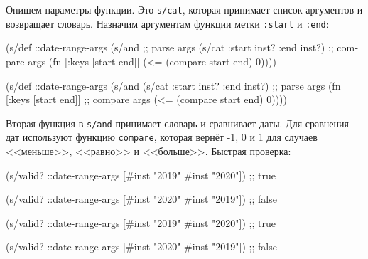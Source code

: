 Опишем параметры функции. Это \verb|s/cat|, которая принимает список аргументов
и возвращает словарь. Назначим аргументам функции метки \verb|:start| и
\verb|:end|:

\ifx\DEVICETYPE\MOBILE

\begin{english}
  \begin{clojure}
(s/def ::date-range-args
  (s/and
    ;; parse args
    (s/cat :start inst? :end inst?)
    ;; compare args
    (fn [{:keys [start end]}]
      (<= (compare start end) 0))))
  \end{clojure}
\end{english}

\else

\begin{english}
  \begin{clojure}
(s/def ::date-range-args
  (s/and
   (s/cat :start inst? :end inst?) ;; parse args
   (fn [{:keys [start end]}]       ;; compare args
     (<= (compare start end) 0))))
  \end{clojure}
\end{english}

\fi


Вторая функция в \verb|s/and| принимает словарь и сравнивает даты. Для сравнения
дат используют функцию \verb|compare|, которая вернёт \mbox{-1}, 0 и 1 для
случаев <<меньше>>, <<равно>> и <<больше>>. Быстрая проверка:

\ifx\DEVICETYPE\MOBILE

\begin{english}
  \begin{clojure}
(s/valid? ::date-range-args
          [#inst "2019" #inst "2020"])
;; true

(s/valid? ::date-range-args
          [#inst "2020" #inst "2019"])
;; false
  \end{clojure}
\end{english}

\else

\begin{english}
  \begin{clojure}
(s/valid? ::date-range-args
          [#inst "2019" #inst "2020"]) ;; true

(s/valid? ::date-range-args
          [#inst "2020" #inst "2019"]) ;; false
  \end{clojure}
\end{english}

\fi


